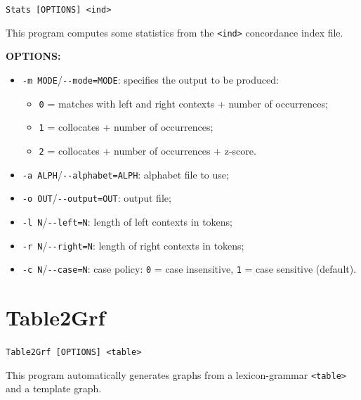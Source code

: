 \verb+Stats [OPTIONS] <ind>+

\bigskip
\noindent This program computes some statistics from the \verb+<ind>+
concordance index file.

\bigskip
\noindent \textbf{OPTIONS:}
\begin{itemize}
  \item \verb+-m MODE+/\verb+--mode=MODE+: specifies the output to be produced:
  \begin{itemize}
      \item \verb+0+ = matches with left and right contexts + number of
      occurrences;
      \item \verb+1+ = collocates + number of occurrences;
      \item \verb+2+ = collocates + number of occurrences + z-score.
  \end{itemize}

  \item \verb+-a ALPH+/\verb+--alphabet=ALPH+: alphabet file to use;

  \item \verb+-o OUT+/\verb+--output=OUT+: output file;

  \item \verb+-l N+/\verb+--left=N+: length of left contexts in tokens;
   
  \item \verb+-r N+/\verb+--right=N+: length of right contexts in tokens;
  
  \item \verb+-c N+/\verb+--case=N+: case policy: \verb+0+ = case insensitive,
  \verb+1+ = case sensitive (default).
\end{itemize}







\section{Table2Grf}
\verb+Table2Grf [OPTIONS] <table>+

\bigskip
\noindent {}This 
program automatically generates graphs from a lexicon-grammar \verb+<table>+
and a template graph.


